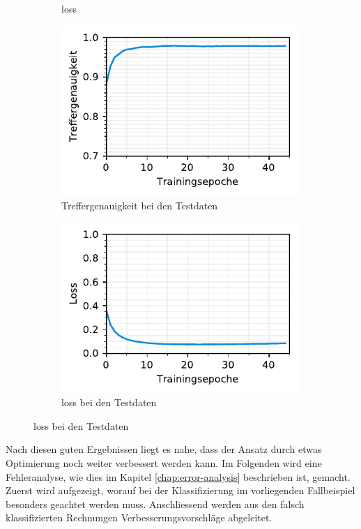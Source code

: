 \begin{figure}[h!]
\begin{subfigure}[b]{0.5\linewidth}
    \caption{loss} 
    \label{text-class-results:loss} 
    \vspace{2ex}
  \end{subfigure} 
  \begin{subfigure}[b]{0.5\linewidth}
    \centering
    \includegraphics[scale=1]{graphics/matplot/textual-class__val_acc.pdf} 
    \caption{Treffergenauigkeit bei den Testdaten} 
    \label{text-class-results:val_acc} 
  \end{subfigure}%
  \begin{subfigure}[b]{0.5\linewidth}
    \centering
    \includegraphics[scale=1]{graphics/matplot/textual-class__val_loss.pdf} 
    \caption{loss bei den Testdaten} 
    \label{text-class-results:val_loss} 
  \end{subfigure}
  \centering
\end{figure}

Nach diesen guten Ergebnissen liegt es nahe, dass der Ansatz durch etwas Optimierung noch weiter verbessert werden kann. Im Folgenden wird eine Fehleranalyse, wie dies im Kapitel \ref{chap:error-analysis} beschrieben ist, gemacht. Zuerst wird aufgezeigt, worauf bei der Klassifizierung im vorliegenden Fallbeispiel besonders geachtet werden muss. Anschliessend werden aus den falsch klassifizierten Rechnungen Verbesserungsvorschläge abgeleitet. 

